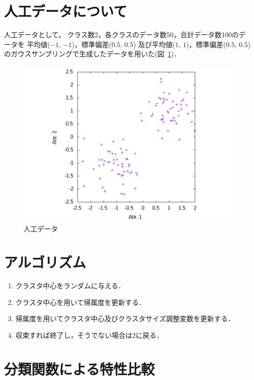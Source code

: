\documentclass[a4j,12pt,dvipdfmx,oneside]{jsbook}
\theoremstyle{definition}
\begin{document}
 \section{人工データについて}\label{sec:about_artificial_data}
 人工データとして，
 クラス数2，各クラスのデータ数50，合計データ数100のデータを
 平均値($-1$, $-1$)，標準偏差($0.5$, $0.5$)
 及び平均値($1$, $1$)，標準偏差($0.5$, $0.5$)
 のガウスサンプリングで生成したデータを用いた(図~\ref{fig:artificial_data})．
 \begin{figure}[htbp]
  \centering
  \includegraphics[width=\linewidth]{2d-dat.pdf}
  \caption{人工データ}
  \label{fig:artificial_data}
 \end{figure}

 \section{アルゴリズム}\label{sec:suggest_algorythm}
  \begin{enumerate}
  \item クラスタ中心をランダムに与える．
  \item クラスタ中心を用いて帰属度を更新する．
  \item 帰属度を用いてクラスタ中心及びクラスタサイズ調整変数を更新する．
  \item 収束すれば終了し，そうでない場合は$2$に戻る．
  \end{enumerate}

 \section{分類関数による特性比較}\label{sec:classification_function}
\end{document}

